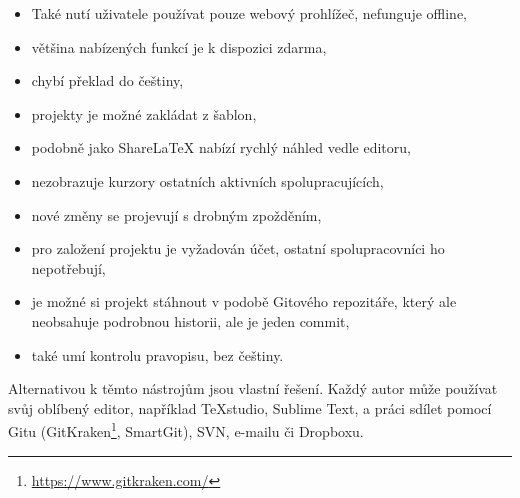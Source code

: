 \begin{itemize}
	\item Také nutí uživatele používat pouze webový prohlížeč, nefunguje offline,
	\item většina nabízených funkcí je k dispozici zdarma,
	\item chybí překlad do češtiny,
	\item projekty je možné zakládat z šablon,
	\item podobně jako ShareLaTeX nabízí rychlý náhled vedle editoru,
	\item nezobrazuje kurzory ostatních aktivních spolupracujících,
	\item nové změny se projevují s drobným zpožděním,
	\item pro založení projektu je vyžadován účet, ostatní spolupracovníci ho nepotřebují,
	\item je možné si projekt stáhnout v podobě Gitového repozitáře, který ale neobsahuje podrobnou historii, ale je jeden commit,
	\item také umí kontrolu pravopisu, bez češtiny.
\end{itemize}

Alternativou k těmto nástrojům jsou vlastní řešení. Každý autor může používat svůj oblíbený editor, například TeXstudio, Sublime Text, a práci sdílet pomocí Gitu (GitKraken\footnote{\url{https://www.gitkraken.com/}}, SmartGit), SVN, e-mailu či Dropboxu.